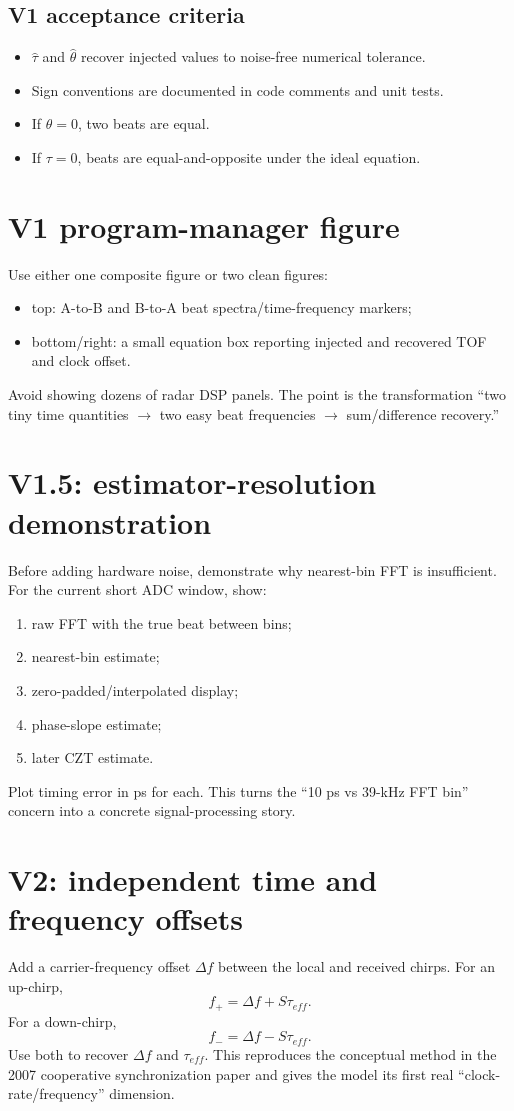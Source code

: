 \documentclass[11pt]{article}
\begin{document}
\subsection{V1 acceptance criteria}
\begin{itemize}
\item $\hat\tau$ and $\hat\theta$ recover injected values to noise-free numerical tolerance.
\item Sign conventions are documented in code comments and unit tests.
\item If $\theta=0$, two beats are equal.
\item If $\tau=0$, beats are equal-and-opposite under the ideal equation.
\end{itemize}

\section{V1 program-manager figure}
Use either one composite figure or two clean figures:
\begin{itemize}
\item top: A-to-B and B-to-A beat spectra/time-frequency markers;
\item bottom/right: a small equation box reporting injected and recovered TOF and clock offset.
\end{itemize}
Avoid showing dozens of radar DSP panels. The point is the transformation ``two tiny time quantities $\rightarrow$ two easy beat frequencies $\rightarrow$ sum/difference recovery.''

\section{V1.5: estimator-resolution demonstration}
Before adding hardware noise, demonstrate why nearest-bin FFT is insufficient. For the current short ADC window, show:
\begin{enumerate}
\item raw FFT with the true beat between bins;
\item nearest-bin estimate;
\item zero-padded/interpolated display;
\item phase-slope estimate;
\item later CZT estimate.
\end{enumerate}
Plot timing error in ps for each. This turns the ``10 ps vs 39-kHz FFT bin'' concern into a concrete signal-processing story.

\section{V2: independent time and frequency offsets}
Add a carrier-frequency offset $\Delta f$ between the local and received chirps. For an up-chirp,
\[
f_+=\Delta f+S\tau_{eff}.
\]
For a down-chirp,
\[
f_-=\Delta f-S\tau_{eff}.
\]
Use both to recover $\Delta f$ and $\tau_{eff}$. This reproduces the conceptual method in the 2007 cooperative synchronization paper and gives the model its first real ``clock-rate/frequency'' dimension.
\end{document}
